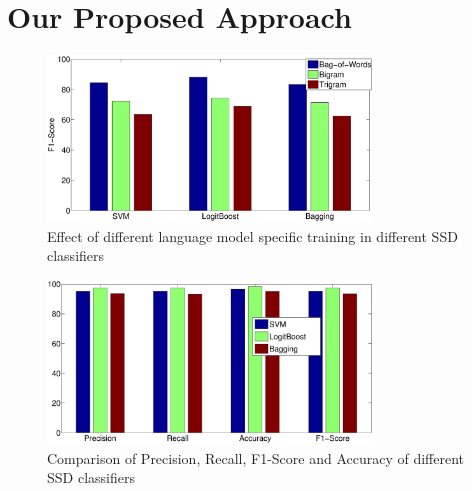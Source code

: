 \section{Our Proposed Approach}
\label{sec:evaluation}

\begin{figure}[hbt]
\centering
\includegraphics[width=3.4in, height= 2.4 in]{./figs/bow.eps}
\caption{Effect of different language model specific training in different SSD classifiers}
\label{train:fig}
\end{figure}

\begin{figure}[hbt]
\centering
\includegraphics[width=3.4in, height= 2.4 in]{./figs/class.eps}
\caption{Comparison of Precision, Recall, F1-Score and Accuracy of different SSD classifiers}
\label{train:fig}
\end{figure}

